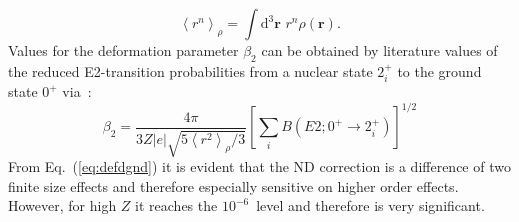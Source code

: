 \begin{equation}
\left< r^n \right>_{\rho} = \int \text{d}^3\mathbf{r}\,\, r^n \rho(\mathbf{r}).
\label{eq:nmoment}
\end{equation}
Values for the deformation parameter $\beta_2$ can be obtained by literature values of the reduced E2-transition probabilities from a nuclear state $2^+_i$ to the ground state $0^+$ via~\cite{Trager}:
\begin{equation}
\beta_2 = \frac{4\pi}{3Z|e|\sqrt{5\left< r^2\right>_{\rho} /3}}\left[ \sum_i B(E2;0^+\rightarrow 2_i^+) \right]^{1/2}
\label{eq:beta}
\end{equation}
From Eq.~(\ref{eq:defdgnd}) it is evident that the ND correction is a difference of two finite size effects and therefore especially sensitive on higher order effects. However, for high $Z$ it reaches the $10^{-6}$~level and therefore is very significant.

